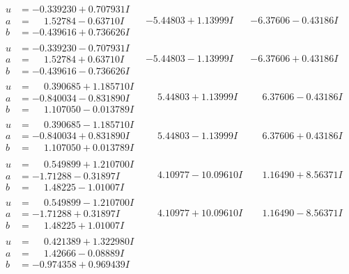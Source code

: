 \documentclass[1p]{elsarticle_modified}
\theoremstyle{definition}
\begin{document}
$$\begin{array}{c|c|c}
\begin{aligned}
u &= -0.339230 + 0.707931 I \\
a &= \phantom{-}1.52784 - 0.63710 I \\
b &= -0.439616 + 0.736626 I\end{aligned}
 & -5.44803 + 1.13999 I & -6.37606 - 0.43186 I \\ \hline\begin{aligned}
u &= -0.339230 - 0.707931 I \\
a &= \phantom{-}1.52784 + 0.63710 I \\
b &= -0.439616 - 0.736626 I\end{aligned}
 & -5.44803 - 1.13999 I & -6.37606 + 0.43186 I \\ \hline\begin{aligned}
u &= \phantom{-}0.390685 + 1.185710 I \\
a &= -0.840034 - 0.831890 I \\
b &= \phantom{-}1.107050 - 0.013789 I\end{aligned}
 & \phantom{-}5.44803 + 1.13999 I & \phantom{-}6.37606 - 0.43186 I \\ \hline\begin{aligned}
u &= \phantom{-}0.390685 - 1.185710 I \\
a &= -0.840034 + 0.831890 I \\
b &= \phantom{-}1.107050 + 0.013789 I\end{aligned}
 & \phantom{-}5.44803 - 1.13999 I & \phantom{-}6.37606 + 0.43186 I \\ \hline\begin{aligned}
u &= \phantom{-}0.549899 + 1.210700 I \\
a &= -1.71288 - 0.31897 I \\
b &= \phantom{-}1.48225 - 1.01007 I\end{aligned}
 & \phantom{-}4.10977 - 10.09610 I & \phantom{-}1.16490 + 8.56371 I \\ \hline\begin{aligned}
u &= \phantom{-}0.549899 - 1.210700 I \\
a &= -1.71288 + 0.31897 I \\
b &= \phantom{-}1.48225 + 1.01007 I\end{aligned}
 & \phantom{-}4.10977 + 10.09610 I & \phantom{-}1.16490 - 8.56371 I \\ \hline\begin{aligned}
u &= \phantom{-}0.421389 + 1.322980 I \\
a &= \phantom{-}1.42666 - 0.08889 I \\
b &= -0.974358 + 0.969439 I\end{aligned}

\end{array}$$
\end{document}
